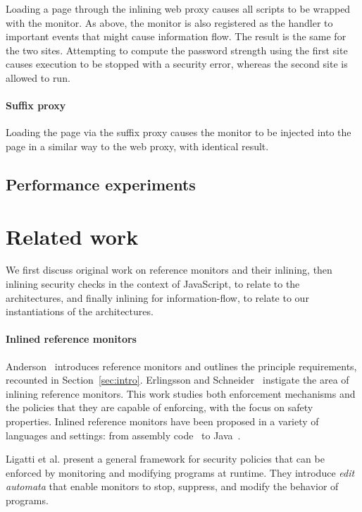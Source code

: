\documentclass{llncs}
\begin{document}
Loading a page through the inlining web proxy causes all scripts to be wrapped
with the monitor. As above, the monitor is also registered as the handler to
important events that might cause information flow. The result is the same
for the two sites. Attempting to compute the password strength using the first
site causes execution to be stopped with a security error, whereas the second
site is allowed to run.

\paragraph{Suffix proxy}

Loading the page via the suffix proxy causes the monitor to be injected into the page in 
a similar way to the web proxy, with identical result.

\subsection{Performance experiments}

\section{Related work}
\label{sec:related}
We first discuss original work on reference monitors and their
inlining, then
inlining security checks in the context of
JavaScript, to relate to the architectures, 
and finally inlining for information-flow, to relate to our instantiations
of the architectures.

\paragraph{Inlined reference monitors}
Anderson~\cite{Anderson:72} introduces reference monitors and
outlines the principle requirements, recounted in Section~\ref{sec:intro}.
%
Erlingsson and Schneider~\cite{DBLP:conf/nspw/ErlingssonS99,Erlingsson:PhD04} instigate
the area of inlining reference monitors. 
This work studies both enforcement mechanisms and the policies
that they are capable of enforcing, with the focus on safety properties.
Inlined reference monitors
have been proposed in a variety of languages and settings: from
assembly code~\cite{DBLP:conf/nspw/ErlingssonS99} to Java~\cite{DBLP:conf/ecoop/DamJLP09,DBLP:journals/jcs/DamJLP10,DBLP:conf/ccs/DamGL12}.

Ligatti et al. \cite{Ligatti05editautomata:} present a 
general framework for security policies that can
be enforced by monitoring and modifying programs at runtime. 
They introduce \emph{edit automata} that enable
monitors to stop, suppress, and modify the behavior of programs. 
\end{document}

